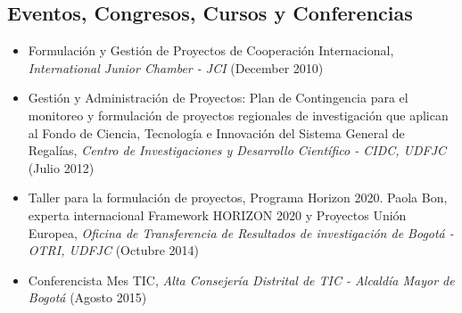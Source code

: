 \documentclass[overlapped,line,final]{../../templates/MichaelDeCorteCV/lib/res}
\begin{document}
\begin{resume}

\section{\sc Eventos, Congresos, Cursos y Conferencias}
\vspace{0.5cm}
\begin{itemize}	
	\item Formulación y Gestión de Proyectos de Cooperación Internacional, \textit{International Junior Chamber - JCI} (December 2010) \href{https://raw.githubusercontent.com/dtorot/NemqCV/profile-engineer/latex/docs/JCI24hr2-3-4-Dic2010.pdf}{}
	\item Gestión y Administración de Proyectos: Plan de Contingencia para el monitoreo y formulación de proyectos regionales de investigación que aplican al Fondo de Ciencia, Tecnología e Innovación del Sistema General de Regalías, \textit{Centro de Investigaciones y Desarrollo Científico - CIDC, UDFJC} (Julio 2012) \href{https://raw.githubusercontent.com/dtorot/NemqCV/profile-engineer/latex/docs/UDFJC-CIDC-CursoTallerGestProyRegalias16Jun-7Jul2012.pdf}{}
	\item Taller para la formulación de proyectos, Programa Horizon 2020. Paola Bon, experta internacional Framework HORIZON 2020 y Proyectos Unión Europea, \textit{Oficina de Transferencia de Resultados de investigación de Bogotá - OTRI, UDFJC} (Octubre 2014) \href{https://raw.githubusercontent.com/dtorot/NemqCV/profile-engineer/latex/docs/UDFJC-CIDC-WorkshopFormProjHorizon2020-24hr-29-30-31Oct2014.pdf}{}
	\item Conferencista Mes TIC, \textit{Alta Consejería Distrital de TIC - Alcaldía Mayor de Bogotá} (Agosto 2015) \href{https://raw.githubusercontent.com/dtorot/NemqCV/profile-engineer/latex/docs/dttConfAlcaldia2015.JPG}{}

\end{itemize}
\end{resume}
\end{document}
